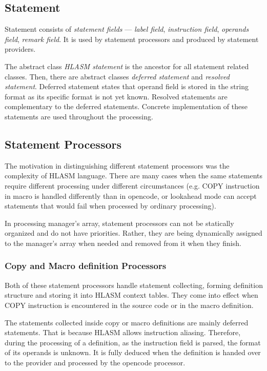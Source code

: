 \subsection{Statement}

Statement consists of \emph{statement fields} --- \emph{label field}, \emph{instruction field}, \emph{operands field}, \emph{remark field}. It is used by statement processors and produced by statement providers. 

The abstract class \emph{HLASM statement} is the ancestor for all statement related classes. Then, there are abstract classes \emph{deferred statement} and \emph{resolved statement}. Deferred statement states that operand field is stored in the string format as its specific format is not yet known. Resolved statements are complementary to the deferred statements. Concrete implementation of these statements are used throughout the processing.

\subsection{Statement Processors}
\label{lab06:sect_proc}

The motivation in distinguishing different statement processors was the complexity of HLASM language. There are many cases when the same statements require different processing under different circumstances (e.g. COPY instruction in macro is handled differently than in opencode, or lookahead mode can accept statements that would fail when processed by ordinary processing).

In processing manager's array, statement processors can not be statically organized and do not have priorities. Rather, they are being dynamically assigned to the manager's array when needed and removed from it when they finish.


\subsubsection{Copy and Macro definition Processors}

Both of these statement processors handle statement collecting, forming definition structure and storing it into HLASM context tables. They come into effect when COPY instruction is encountered in the source code or in the macro definition. 

The statements collected inside copy or macro definitions are mainly deferred statements. That is because HLASM allows instruction aliasing. Therefore, during the processing of a definition, as the instruction field is parsed, the format of its operands is unknown. It is fully deduced when the definition is handed over to the provider and processed by the opencode processor.

